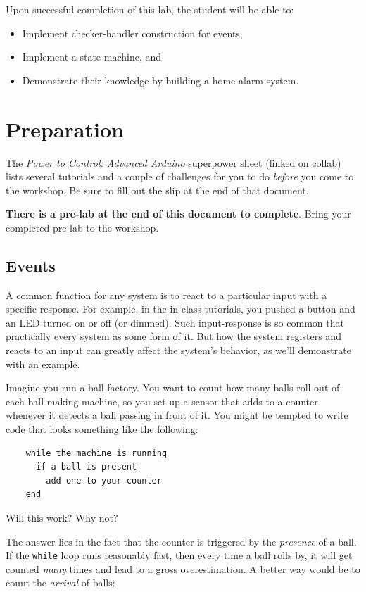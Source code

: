 \documentclass[11pt]{article} %
\begin{document}
Upon successful completion of this lab, the student will be able to:
\begin{itemize}
\item Implement checker-handler construction for events,
\item Implement a state machine, and
\item Demonstrate their knowledge by building a home alarm system.
\end{itemize}

\section*{Preparation}

The \emph{Power to Control: Advanced Arduino} superpower sheet (linked on collab) lists several tutorials and a couple of challenges for you to do \emph{before} you come to the workshop. Be sure to fill out the slip at the end of that document.

\textbf{There is a pre-lab at the end of this document to complete}. Bring your completed pre-lab to the workshop.

\subsection*{Events}

A common function for any system is to react to a particular input with a specific response. For example, in the in-class tutorials, you pushed a button and an LED turned on or off (or dimmed). Such input-response is so common that practically every system as some form of it. But how the system registers and reacts to an input can greatly affect the system's behavior, as we'll demonstrate with an example.

Imagine you run a ball factory. You want to count how many balls roll out of each ball-making machine, so you set up a sensor that adds to a counter whenever it detects a ball passing in front of it. You might be tempted to write code that looks something like the following:

\begin{verbatim}
    while the machine is running
      if a ball is present
        add one to your counter
    end 

\end{verbatim}

Will this work? Why not?

The answer lies in the fact that the counter is triggered by the \emph{presence} of a ball. If the \verb|while| loop runs reasonably fast, then every time a ball rolls by, it will get counted \emph{many} times and lead to a gross overestimation. A better way would be to count the \emph{arrival} of balls:
\end{document}
